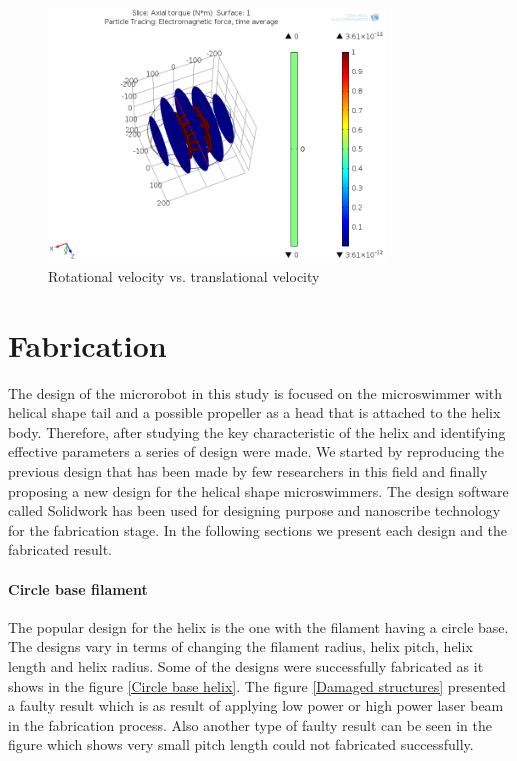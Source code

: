 \documentclass[12pt,a4paper,titlepage]{report}
\begin{document}
\begin{figure}
  \centering
    \includegraphics[width=0.80\textwidth]{moving_direction.png}
  \caption[Rotational velocity vs. translational velocity]{Rotational velocity vs. translational velocity}
  \label{Rotational velocity vs. translational velocity}
\end{figure}


\section{Fabrication}

The design of the microrobot in this study is focused on the microswimmer with helical shape tail 
and a possible propeller as a head that is attached to the helix body. Therefore, after studying the 
key characteristic of the helix and identifying effective parameters a series of design were made. We started 
by reproducing the previous design that has been made by few researchers in this field and finally proposing a
new design for the helical shape microswimmers. The design software called Solidwork has been used for 
designing purpose and nanoscribe technology for the fabrication stage. In the following sections we present 
each design and the fabricated result.

\paragraph{Circle base filament}
The popular design for the helix is the one with the filament having a circle base. The designs vary in terms of 
changing the filament radius, helix pitch, helix length and helix radius. Some of the designs were successfully fabricated
as it shows in the figure \ref{Circle base helix}. The figure \ref{Damaged structures} presented a faulty result which is as result of applying low power or 
high power laser beam in the fabrication process. Also another type of faulty result can be seen in the figure
which shows very small pitch length could not fabricated successfully.
\end{document}
